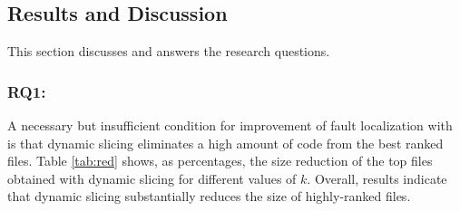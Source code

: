 \documentclass{article}
\begin{document}

\subsection{Results and Discussion}

This section discusses and answers the research questions.







\subsubsection{\label{rq:1}RQ1: \textit{\rqone}}

A necessary but insufficient condition for improvement of fault
localization with \comb{} is that dynamic slicing eliminates a high
amount of code from the best ranked files. Table \ref{tab:red} shows,
as percentages, the size reduction of the top files obtained with
dynamic slicing for different values of $k$. Overall, results indicate
that dynamic slicing substantially reduces the size of highly-ranked
files.



\end{document}
